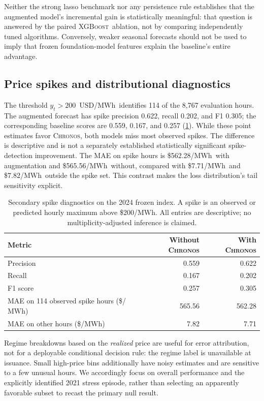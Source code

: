 \documentclass[11pt,letterpaper]{article}
\newcommand{\MWh}{\ensuremath{\mathrm{MWh}}}
\newcommand{\USD}{\ensuremath{\mathrm{USD}}}
\newcommand{\Chronos}{\textsc{Chronos}}
\newcommand{\XGB}{\textsc{XGBoost}}
\begin{document}
Neither the strong lasso benchmark nor any persistence rule establishes that the augmented model's incremental gain is statistically meaningful: that question is answered by the paired \XGB\ ablation, not by comparing independently tuned algorithms. Conversely, weaker seasonal forecasts should not be used to imply that frozen foundation-model features explain the baseline's entire advantage.

\subsection{Price spikes and distributional diagnostics}
The threshold $y_t>200$~\USD/\MWh\ identifies 114 of the 8,767 evaluation hours. The augmented forecast has spike precision 0.622, recall 0.202, and F1 0.305; the corresponding baseline scores are 0.559, 0.167, and 0.257 (\cref{tab:spikes}). While these point estimates favor \Chronos, both models miss most observed spikes. The difference is descriptive and is not a separately established statistically significant spike-detection improvement. The MAE on spike hours is \$562.28/\MWh\ with augmentation and \$565.56/\MWh\ without, compared with \$7.71/\MWh\ and \$7.82/\MWh\ outside the spike set. This contrast makes the loss distribution's tail sensitivity explicit.

\begin{table}[t]
\centering\small
\caption{Secondary spike diagnostics on the 2024 frozen index. A spike is an observed or predicted hourly maximum above \$200/\MWh. All entries are descriptive; no multiplicity-adjusted inference is claimed.}\label{tab:spikes}
\begin{tabular}{@{}lrr@{}}
\toprule
Metric & Without \Chronos & With \Chronos\\
\midrule
Precision & 0.559 & 0.622\\
Recall & 0.167 & 0.202\\
F1 score & 0.257 & 0.305\\
MAE on 114 observed spike hours (\$/\MWh) & 565.56 & 562.28\\
MAE on other hours (\$/\MWh) & 7.82 & 7.71\\
\bottomrule
\end{tabular}
\end{table}

Regime breakdowns based on the \emph{realized} price are useful for error attribution, not for a deployable conditional decision rule: the regime label is unavailable at issuance. Small high-price bins additionally have noisy estimates and are sensitive to a few unusual hours. We accordingly focus on overall performance and the explicitly identified 2021 stress episode, rather than selecting an apparently favorable subset to recast the primary null result.
\end{document}
